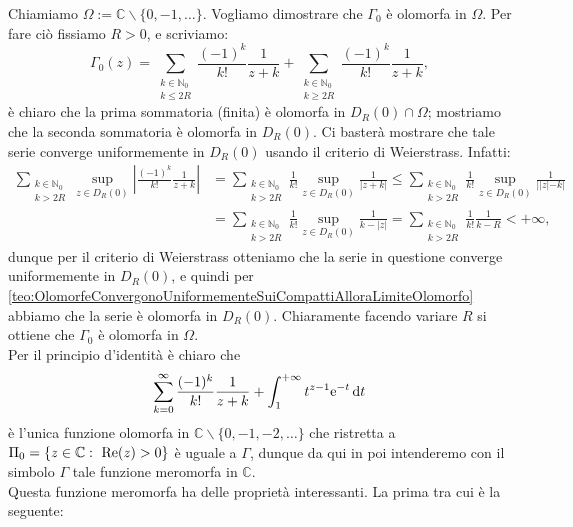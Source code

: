 \documentclass[11pt]{book}
\theoremstyle{Definizione}
\theoremstyle{TeoremaProposizioneLemmaCorollarioCongettura}
\theoremstyle{OsservazioneNotaEsempio}
\newcommand{\N}{\mathbb{N}}
\newcommand{\C}{\mathbb{C}}
\newcommand{\Disc}[3][]{D^{#1}_{{#2}}({#3})}
\newcommand{\tolto}{\smallsetminus}
\renewcommand{\Re}{\textup{Re}}
\newcommand{\e}{\textup{e}}
\renewcommand{\d}{\mathrm{d}}
\newcommand{\dt}{\,\d t}
\begin{document}
Chiamiamo $\Omega := \C \tolto \{0,-1,\dots\}$. Vogliamo dimostrare che $\Gamma_0$ è olomorfa in $\Omega$. Per fare ciò fissiamo $R > 0$, e scriviamo:
$$
\Gamma_0(z) = \sum_{\substack{k\in \N_0\\ k \leq 2R}} \frac{(-1)^k}{k!}\frac{1}{z+k}+\sum_{\substack{k\in \N_0\\ k \geq 2R }} \frac{(-1)^k}{k!}\frac{1}{z+k},
$$
è chiaro che la prima sommatoria (finita) è olomorfa in $\Disc{R}{0}\cap \Omega$; mostriamo che la seconda sommatoria è olomorfa in $\Disc{R}{0}$. Ci basterà mostrare che tale serie converge uniformemente in $\Disc{R}{0}$ usando il criterio di Weierstrass. Infatti:
\begin{align*}
\sum_{\substack{k\in \N_0\\ k > 2R}} \sup_{z\in \Disc{R}{0}}\left|\frac{(-1)^k}{k!}\frac{1}{z+k}\right| &= \sum_{\substack{k\in \N_0\\ k > 2R}} \frac{1}{k!}\sup_{z\in \Disc{R}{0}}\frac{1}{|z+k|} \leq \sum_{\substack{k\in \N_0\\ k > 2R}} \frac{1}{k!}\sup_{z\in \Disc{R}{0}} \frac{1}{||z|-k|} \\
&= \sum_{\substack{k \in \N_0\\ k > 2R}} \frac{1}{k!}\sup_{z\in \Disc{R}{0}} \frac{1}{k-|z|} = \sum_{\substack{k\in \N_0\\ k > 2R}} \frac{1}{k!}\frac{1}{k-R} < +\infty,
\end{align*}
dunque per il criterio di Weierstrass otteniamo che la serie in questione converge uniformemente in $\Disc{R}{0}$, e quindi per \ref{teo:OlomorfeConvergonoUniformementeSuiCompattiAlloraLimiteOlomorfo} abbiamo che la serie è olomorfa in $\Disc{R}{0}$. Chiaramente facendo variare $R$ si ottiene che $\Gamma_0$ è olomorfa in $\Omega$.\\
Per il principio d'identità è chiaro che
\begin{equation}\label{eq:EspressioneGammaEstesa}
\sum_{k = 0}^\infty \frac{(-1)^k}{k!}\frac{1}{z+k}+\int_1^{+\infty} t^{z-1}\e^{-t}\dt
\end{equation}
è l'unica funzione olomorfa in $\C \tolto \{0,-1,-2,\dots\}$ che ristretta a $\Pi_0 = \{z\in \C:\ \Re(z) > 0\}$ è uguale a $\Gamma$, dunque da qui in poi intenderemo con il simbolo $\Gamma$ tale funzione meromorfa in $\C$.\\
Questa funzione meromorfa ha delle proprietà interessanti. La prima tra cui è la seguente:
\end{document}
